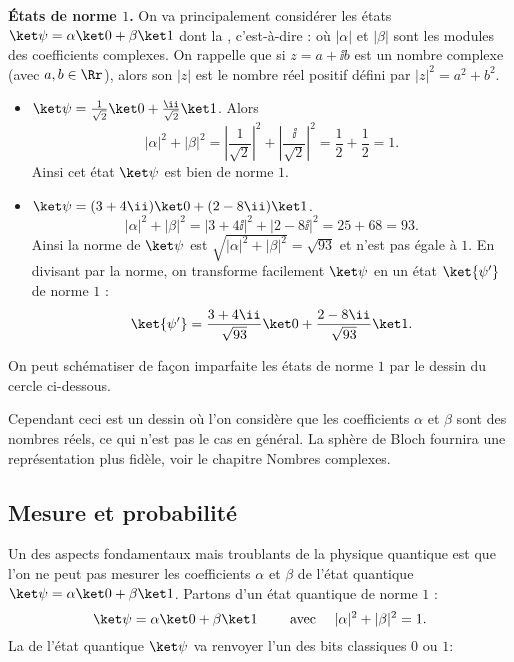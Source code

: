 \documentclass[11pt,class=report,crop=false]{standalone}
\begin{document}
\textbf{États de norme $1$.} On va principalement considérer les états $\ket\psi = \alpha\ket0+\beta\ket1$ dont la , c'est-à-dire :
où $|\alpha|$ et $|\beta|$ sont les modules des coefficients complexes.
On rappelle que si $z = a+\ii b$ est un nombre complexe (avec $a,b\in\Rr$), alors son  $|z|$ est le nombre réel positif défini par $|z|^2 = a^2+b^2$.

\begin{exemple}
\sauteligne
\begin{itemize}

  \item $\ket\psi = \frac{1}{\sqrt2} \ket0 + \frac{\ii}{\sqrt2}\ket1$.  
  Alors 
  $$|\alpha|^2 + |\beta|^2 = \left|\frac{1}{\sqrt2}\right|^2+\left|\frac{\ii}{\sqrt2}\right|^2
  = \frac12+\frac12 = 1.$$
  Ainsi cet état $\ket\psi$ est bien de norme $1$.
  
  \item $\ket\psi = (3+4\ii)\ket0 + (2-8\ii)\ket1$.
   $$|\alpha|^2 + |\beta|^2 = |3+4\ii|^2 + |2-8\ii|^2 = 25 + 68 = 93.$$
   Ainsi la norme de $\ket\psi$ est $\sqrt{|\alpha|^2 + |\beta|^2} = \sqrt{93}$ et
   n'est pas égale à $1$. En divisant par la norme, on transforme facilement $\ket\psi$ en un état $\ket{\psi'}$ de norme $1$ :
   $$\ket{\psi'} = \frac{3+4\ii}{\sqrt{93}}  \ket0 + \frac{2-8\ii}{\sqrt{93}}\ket1.$$
\end{itemize}
\end{exemple}

\begin{remarque*}
On peut schématiser de façon imparfaite les états de norme $1$ par le dessin du cercle ci-dessous.


Cependant ceci est un dessin où l'on considère que les coefficients $\alpha$ et $\beta$ sont des nombres réels, ce qui n'est pas le cas en général. La \og{}sphère de Bloch\fg{} fournira une représentation plus fidèle, voir le chapitre \og{}Nombres complexes\fg{}.
\end{remarque*}


\subsection{Mesure et probabilité}

Un des aspects fondamentaux mais troublants de la physique quantique est que l'on ne peut pas mesurer les coefficients $\alpha$ et $\beta$ de l'état quantique $\ket \psi = \alpha \ket0+\beta\ket1$.
Partons d'un état quantique de norme $1$ :
$$\ket \psi = \alpha \ket0+\beta\ket1 \qquad \text{ avec } \quad |\alpha|^2 + |\beta|^2 = 1.$$
La  de l'état quantique $\ket\psi$ va renvoyer l'un des bits classiques $0$ ou $1$:
\end{document}
